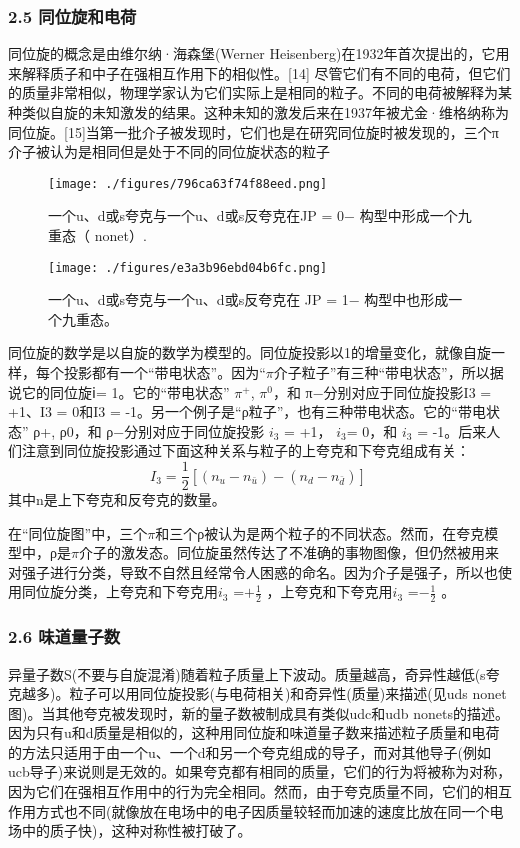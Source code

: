 \subsubsection{2.5 同位旋和电荷}
同位旋的概念是由维尔纳·海森堡(Werner Heisenberg)在1932年首次提出的，它用来解释质子和中子在强相互作用下的相似性。[14] 尽管它们有不同的电荷，但它们的质量非常相似，物理学家认为它们实际上是相同的粒子。不同的电荷被解释为某种类似自旋的未知激发的结果。这种未知的激发后来在1937年被尤金·维格纳称为同位旋。[15]当第一批介子被发现时，它们也是在研究同位旋时被发现的，三个π介子被认为是相同但是处于不同的同位旋状态的粒子
\begin{figure}[ht]
\centering
\texttt{[image: ./figures/796ca63f74f88eed.png]}
\caption{一个u、d或s夸克与一个u、d或s反夸克在JP = 0− 构型中形成一个九重态（ nonet）.} \label{fig_JZ_1}
\end{figure}
\begin{figure}[ht]
\centering
\texttt{[image: ./figures/e3a3b96ebd04b6fc.png]}
\caption{一个u、d或s夸克与一个u、d或s反夸克在 JP = 1− 构型中也形成一个九重态。} \label{fig_JZ_2}
\end{figure}
同位旋的数学是以自旋的数学为模型的。同位旋投影以1的增量变化，就像自旋一样，每个投影都有一个“带电状态”。因为“$\pi$介子粒子”有三种“带电状态”，所以据说它的同位旋ⅰ= 1。它的“带电状态” $\pi^+$, $\pi^0$，和 π−分别对应于同位旋投影I3 = +1、I3 = 0和I3 = -1。另一个例子是“ρ粒子”，也有三种带电状态。它的“带电状态” ρ+, ρ0，和 ρ−分别对应于同位旋投影 $i_3$ = +1， $i_3$= 0，和 $i_3$ = -1。后来人们注意到同位旋投影通过下面这种关系与粒子的上夸克和下夸克组成有关：\begin{equation}
I_3=\frac{1}{2}[(n_u-n_{\bar u})-(n_d-n_{\bar d})]~
\end{equation}
其中n是上下夸克和反夸克的数量。

在“同位旋图”中，三个$\pi$和三个ρ被认为是两个粒子的不同状态。然而，在夸克模型中，ρ是$\pi$介子的激发态。同位旋虽然传达了不准确的事物图像，但仍然被用来对强子进行分类，导致不自然且经常令人困惑的命名。因为介子是强子，所以也使用同位旋分类，上夸克和下夸克用$ i_3$ =$+\frac{1}{2}$ ，上夸克和下夸克用$ i_3$ =$-\frac{1}{2}$  。

\subsubsection{2.6 味道量子数}
异量子数S(不要与自旋混淆)随着粒子质量上下波动。质量越高，奇异性越低(s夸克越多)。粒子可以用同位旋投影(与电荷相关)和奇异性(质量)来描述(见uds nonet图)。当其他夸克被发现时，新的量子数被制成具有类似udc和udb nonets的描述。因为只有u和d质量是相似的，这种用同位旋和味道量子数来描述粒子质量和电荷的方法只适用于由一个u、一个d和另一个夸克组成的导子，而对其他导子(例如ucb导子)来说则是无效的。如果夸克都有相同的质量，它们的行为将被称为对称，因为它们在强相互作用中的行为完全相同。然而，由于夸克质量不同，它们的相互作用方式也不同(就像放在电场中的电子因质量较轻而加速的速度比放在同一个电场中的质子快)，这种对称性被打破了。

